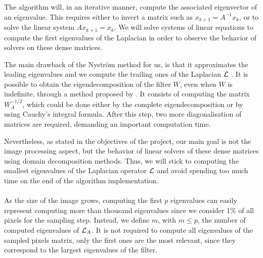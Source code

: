The algorithm will, in an iterative manner, compute the associated eigenvector of an eigenvalue.
This requires either to invert a matrix such as \(x_{k+1} = A^{-1} x_k\), or to solve the linear system \(A x_{k+1} = x_k\).
We will solve systems of linear equations to compute the first eigenvalues of the Laplacian in order to observe the behavior of solvers on these dense matrices.

The main drawback of the Nystr\"om method for us, is that it approximates the leading eigenvalues and we compute the trailing ones of the Laplacian \(\operatorname{\mathcal{L}}\) \cite{belongie_spectral_2002}.
It is possible to obtain the eigendecomposition of the filter \(W\), even when \(W\) is indefinite, through a method proposed by \cite{fowlkes_spectral_2004}.
It consists of computing the matrix \(W_A^{-1/2}\), which could be done either by the complete eigendecomposition or by using Cauchy's integral formula.
After this step, two more diagonalisation of matrices are required, demanding an important computation time.

Nevertheless, as stated in the objectives of the project, our main goal is not the image processing aspect, but the behavior of linear solvers of these dense matrices using domain decomposition methods.
Thus, we will stick to computing the smallest eigenvalues of the Laplacian operator \(\operatorname{\mathcal{L}}\) and avoid spending too much time on the end of the algorithm implementation.

\paragraph{}
As the size of the image grows, computing the first \(p\) eigenvalues can easily represent computing more than thousand eigenvalues since we consider 1\% of all pixels for the sampling step.
Instead, we define \(m\), with \(m \le p\), the number of computed eigenvalues of \(\operatorname{\mathcal{L}}_A\).
It is not required to compute all eigenvalues of the sampled pixels matrix, only the first ones are the most relevant, since they correspond to the largest eigenvalues of the filter.

